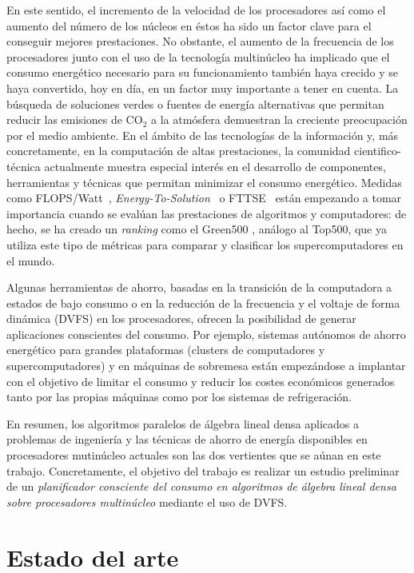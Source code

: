 En este sentido, el incremento de la velocidad de los procesadores así como el aumento 
del número de los núcleos en éstos ha sido un factor clave para el conseguir 
mejores prestaciones. No obstante, el aumento de la frecuencia de los 
procesadores junto con el uso de la tecnología multinúcleo ha implicado que el 
consumo energético necesario para su funcionamiento también haya crecido y se 
haya convertido, hoy en día, en un factor muy importante a tener en cuenta. La búsqueda de 
soluciones verdes o fuentes de energía alternativas que permitan reducir las 
emisiones de CO$_2$ a la atmósfera demuestran la creciente preocupación por 
el medio ambiente. En el ámbito de las tecnologías de la información y, más 
concretamente, en la computación de altas prestaciones, la comunidad 
cientifico-técnica actualmente muestra especial interés en el desarrollo de 
componentes, herramientas y técnicas que permitan minimizar el consumo 
energético. Medidas como FLOPS/Watt~\cite{flopswatt}, \emph{Energy-To-Solution}~\cite{Minartz} 
o FTTSE~\cite{Bekas} están empezando a tomar importancia cuando se evalúan 
las prestaciones de algoritmos y computadores: de hecho, se ha creado un \emph{ranking}
como el Green500 \cite{feng2009green500}, análogo al Top500, que ya utiliza este tipo de métricas para comparar 
y clasificar los supercomputadores en el mundo.

Algunas herramientas de ahorro, basadas en la transición de la computadora a estados 
de bajo consumo o en la reducción de la frecuencia y el voltaje de forma 
dinámica (DVFS) en los procesadores, ofrecen la posibilidad de generar aplicaciones conscientes
del consumo. Por ejemplo, sistemas autónomos de ahorro energético para 
grandes plataformas (clusters de computadores y supercomputadores) y en máquinas 
de sobremesa están empezándose a implantar con el objetivo de limitar el consumo y reducir 
los costes económicos generados tanto por las propias máquinas como por los sistemas 
de refrigeración.

En resumen, los algoritmos paralelos de álgebra lineal densa
aplicados a problemas de ingeniería y las técnicas de ahorro de energía 
disponibles en procesadores mutinúcleo actuales son las dos vertientes que se 
aúnan en este trabajo. Concretamente, el objetivo del trabajo es realizar 
un estudio preliminar de un \emph{planificador consciente del consumo en 
algoritmos de álgebra lineal densa sobre procesadores multinúcleo} mediante
el uso de DVFS. 

\section{Estado del arte}


